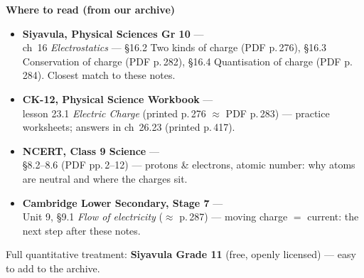 \documentclass[11pt,a4paper]{article}
\newcommand{\nsec}[1]{\vspace{8pt}\par{\color{accent}\large\bfseries #1}\par\vspace{2pt}}
\begin{document}
\nsec{Where to read (from our archive)}
\begin{itemize}[leftmargin=1.2em, itemsep=3pt, topsep=2pt]
  \item \textbf{Siyavula, Physical Sciences Gr 10} ---
        {\small{}}\\
        {\small ch~16 \emph{Electrostatics} --- \S16.2 Two kinds of charge (PDF p.\,276),
        \S16.3 Conservation of charge (PDF p.\,282), \S16.4 Quantisation of charge (PDF p.\,284).
        Closest match to these notes.}
  \item \textbf{CK-12, Physical Science Workbook} ---
        {\small{}}\\
        {\small lesson 23.1 \emph{Electric Charge} (printed p.\,276 $\approx$ PDF p.\,283) ---
        practice worksheets; answers in ch~26.23 (printed p.\,417).}
  \item \textbf{NCERT, Class 9 Science} ---
        {\small{}}\\
        {\small \S8.2--8.6 (PDF pp.\,2--12) --- protons \& electrons, atomic number: why atoms are
        neutral and where the charges sit.}
  \item \textbf{Cambridge Lower Secondary, Stage 7} ---
        {\small{}}\\
        {\small Unit 9, \S9.1 \emph{Flow of electricity} ($\approx$ p.\,287) --- moving charge $=$ current:
        the next step after these notes.}
\end{itemize}

{\small\color{muted} Full quantitative treatment: \textbf{Siyavula Grade 11} (free, openly licensed) --- easy to add to the archive.}
\end{document}
